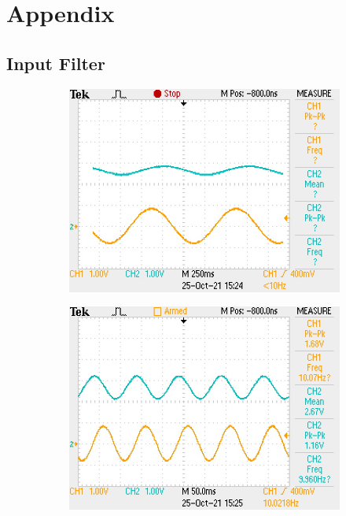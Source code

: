 \documentclass[11pt]{article}
\begin{document}
{\newpage
\section*{Appendix}

\subsection*{Input Filter}
\begin{figure}[h!]
  \centering
  \begin{subfigure}{0.3\textwidth}
    \includegraphics[width=\columnwidth]{img/testing/input_filter/input_1Hz.JPG}
  \end{subfigure}
  \begin{subfigure}{0.3\textwidth}
    \includegraphics[width=\columnwidth]{img/testing/input_filter/input_10Hz.JPG}

\end{subfigure}
\end{figure}}
\end{document}
